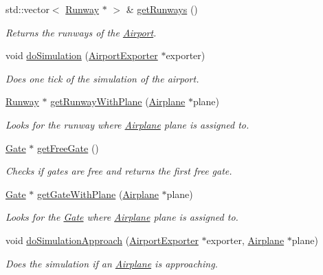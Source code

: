 \begin{DoxyCompactItemize}
std\+::vector$<$ \mbox{\hyperlink{class_runway}{Runway}} $\ast$ $>$ \& \mbox{\hyperlink{class_airport_a45ebc0d8a4e5b8efa6efb31b03955dbd}{get\+Runways}} ()
\begin{DoxyCompactList}\small\item\em Returns the runways of the \mbox{\hyperlink{class_airport}{Airport}}. \end{DoxyCompactList}\item 
void \mbox{\hyperlink{class_airport_a07b5744d0a5fc278437140b20bcd9b7f}{do\+Simulation}} (\mbox{\hyperlink{class_airport_exporter}{Airport\+Exporter}} $\ast$exporter)
\begin{DoxyCompactList}\small\item\em Does one tick of the simulation of the airport. \end{DoxyCompactList}\item 
\mbox{\hyperlink{class_runway}{Runway}} $\ast$ \mbox{\hyperlink{class_airport_acdf571dae312ffa3ac5bd0710aa1cb56}{get\+Runway\+With\+Plane}} (\mbox{\hyperlink{class_airplane}{Airplane}} $\ast$plane)
\begin{DoxyCompactList}\small\item\em Looks for the runway where \mbox{\hyperlink{class_airplane}{Airplane}} plane is assigned to. \end{DoxyCompactList}\item 
\mbox{\hyperlink{class_gate}{Gate}} $\ast$ \mbox{\hyperlink{class_airport_a6bcdea90491d54be7f41c624006dec2c}{get\+Free\+Gate}} ()
\begin{DoxyCompactList}\small\item\em Checks if gates are free and returns the first free gate. \end{DoxyCompactList}\item 
\mbox{\hyperlink{class_gate}{Gate}} $\ast$ \mbox{\hyperlink{class_airport_a29b9bed08d03a28f16ad645bb6d6a24b}{get\+Gate\+With\+Plane}} (\mbox{\hyperlink{class_airplane}{Airplane}} $\ast$plane)
\begin{DoxyCompactList}\small\item\em Looks for the \mbox{\hyperlink{class_gate}{Gate}} where \mbox{\hyperlink{class_airplane}{Airplane}} plane is assigned to. \end{DoxyCompactList}\item 
void \mbox{\hyperlink{class_airport_adb326706ff278a175efb9a55f31c4fa3}{do\+Simulation\+Approach}} (\mbox{\hyperlink{class_airport_exporter}{Airport\+Exporter}} $\ast$exporter, \mbox{\hyperlink{class_airplane}{Airplane}} $\ast$plane)
\begin{DoxyCompactList}\small\item\em Does the simulation if an \mbox{\hyperlink{class_airplane}{Airplane}} is approaching. \end{DoxyCompactList}\item 

\end{DoxyCompactItemize}
